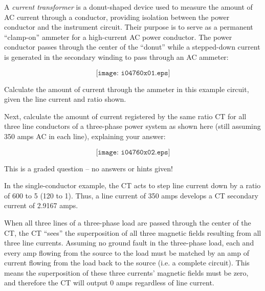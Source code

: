 

A {\it current transformer} is a donut-shaped device used to measure the amount of AC current through a conductor, providing isolation between the power conductor and the instrument circuit.  Their purpose is to serve as a permanent ``clamp-on'' ammeter for a high-current AC power conductor.  The power conductor passes through the center of the ``donut'' while a stepped-down current is generated in the secondary winding to pass through an AC ammeter:

$$\texttt{[image: i04760x01.eps]}$$

Calculate the amount of current through the ammeter in this example circuit, given the line current and ratio shown.

\vskip 50pt

Next, calculate the amount of current registered by the same ratio CT for all three line conductors of a three-phase power system as shown here (still assuming 350 amps AC in each line), explaining your answer:

$$\texttt{[image: i04760x02.eps]}$$

\vfil 

\eject






This is a graded question -- no answers or hints given!







In the single-conductor example, the CT acts to step line current down by a ratio of 600 to 5 (120 to 1).  Thus, a line current of 350 amps develops a CT secondary current of 2.9167 amps.

\vskip 10pt

When all three lines of a three-phase load are passed through the center of the CT, the CT ``sees'' the superposition of all three magnetic fields resulting from all three line currents.  Assuming no ground fault in the three-phase load, each and every amp flowing from the source to the load must be matched by an amp of current flowing from the load back to the source (i.e. a complete circuit).  This means the superposition of these three currents' magnetic fields must be zero, and therefore the CT will output 0 amps regardless of line current.

